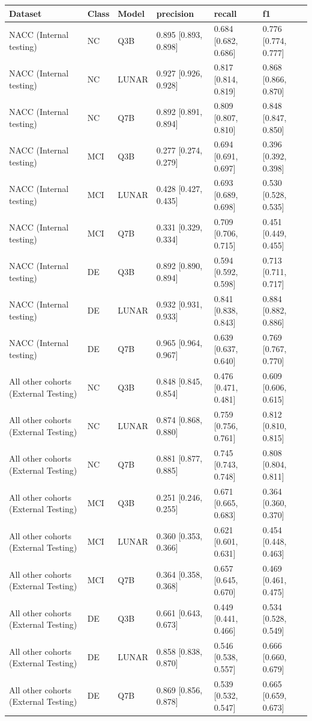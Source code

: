 \begin{tabular}{llllll}
\toprule
Dataset & Class & Model & precision & recall & f1 \\
\midrule
NACC (Internal testing) & NC & Q3B & 0.895 [0.893, 0.898] & 0.684 [0.682, 0.686] & 0.776 [0.774, 0.777] \\
NACC (Internal testing) & NC & LUNAR & 0.927 [0.926, 0.928] & 0.817 [0.814, 0.819] & 0.868 [0.866, 0.870] \\
NACC (Internal testing) & NC & Q7B & 0.892 [0.891, 0.894] & 0.809 [0.807, 0.810] & 0.848 [0.847, 0.850] \\
NACC (Internal testing) & MCI & Q3B & 0.277 [0.274, 0.279] & 0.694 [0.691, 0.697] & 0.396 [0.392, 0.398] \\
NACC (Internal testing) & MCI & LUNAR & 0.428 [0.427, 0.435] & 0.693 [0.689, 0.698] & 0.530 [0.528, 0.535] \\
NACC (Internal testing) & MCI & Q7B & 0.331 [0.329, 0.334] & 0.709 [0.706, 0.715] & 0.451 [0.449, 0.455] \\
NACC (Internal testing) & DE & Q3B & 0.892 [0.890, 0.894] & 0.594 [0.592, 0.598] & 0.713 [0.711, 0.717] \\
NACC (Internal testing) & DE & LUNAR & 0.932 [0.931, 0.933] & 0.841 [0.838, 0.843] & 0.884 [0.882, 0.886] \\
NACC (Internal testing) & DE & Q7B & 0.965 [0.964, 0.967] & 0.639 [0.637, 0.640] & 0.769 [0.767, 0.770] \\
All other cohorts (External Testing) & NC & Q3B & 0.848 [0.845, 0.854] & 0.476 [0.471, 0.481] & 0.609 [0.606, 0.615] \\
All other cohorts (External Testing) & NC & LUNAR & 0.874 [0.868, 0.880] & 0.759 [0.756, 0.761] & 0.812 [0.810, 0.815] \\
All other cohorts (External Testing) & NC & Q7B & 0.881 [0.877, 0.885] & 0.745 [0.743, 0.748] & 0.808 [0.804, 0.811] \\
All other cohorts (External Testing) & MCI & Q3B & 0.251 [0.246, 0.255] & 0.671 [0.665, 0.683] & 0.364 [0.360, 0.370] \\
All other cohorts (External Testing) & MCI & LUNAR & 0.360 [0.353, 0.366] & 0.621 [0.601, 0.631] & 0.454 [0.448, 0.463] \\
All other cohorts (External Testing) & MCI & Q7B & 0.364 [0.358, 0.368] & 0.657 [0.645, 0.670] & 0.469 [0.461, 0.475] \\
All other cohorts (External Testing) & DE & Q3B & 0.661 [0.643, 0.673] & 0.449 [0.441, 0.466] & 0.534 [0.528, 0.549] \\
All other cohorts (External Testing) & DE & LUNAR & 0.858 [0.838, 0.870] & 0.546 [0.538, 0.557] & 0.666 [0.660, 0.679] \\
All other cohorts (External Testing) & DE & Q7B & 0.869 [0.856, 0.878] & 0.539 [0.532, 0.547] & 0.665 [0.659, 0.673] \\
\bottomrule
\end{tabular}
